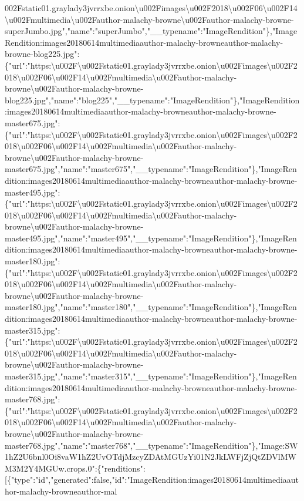 002Fstatic01.graylady3jvrrxbe.onion\textbackslash{}u002Fimages\textbackslash{}u002F2018\textbackslash{}u002F06\textbackslash{}u002F14\textbackslash{}u002Fmultimedia\textbackslash{}u002Fauthor-malachy-browne\textbackslash{}u002Fauthor-malachy-browne-superJumbo.jpg","name":"superJumbo","\_\_typename":"ImageRendition"\},"ImageRendition:images20180614multimediaauthor-malachy-browneauthor-malachy-browne-blog225.jpg":\{"url":"https:\textbackslash{}u002F\textbackslash{}u002Fstatic01.graylady3jvrrxbe.onion\textbackslash{}u002Fimages\textbackslash{}u002F2018\textbackslash{}u002F06\textbackslash{}u002F14\textbackslash{}u002Fmultimedia\textbackslash{}u002Fauthor-malachy-browne\textbackslash{}u002Fauthor-malachy-browne-blog225.jpg","name":"blog225","\_\_typename":"ImageRendition"\},"ImageRendition:images20180614multimediaauthor-malachy-browneauthor-malachy-browne-master675.jpg":\{"url":"https:\textbackslash{}u002F\textbackslash{}u002Fstatic01.graylady3jvrrxbe.onion\textbackslash{}u002Fimages\textbackslash{}u002F2018\textbackslash{}u002F06\textbackslash{}u002F14\textbackslash{}u002Fmultimedia\textbackslash{}u002Fauthor-malachy-browne\textbackslash{}u002Fauthor-malachy-browne-master675.jpg","name":"master675","\_\_typename":"ImageRendition"\},"ImageRendition:images20180614multimediaauthor-malachy-browneauthor-malachy-browne-master495.jpg":\{"url":"https:\textbackslash{}u002F\textbackslash{}u002Fstatic01.graylady3jvrrxbe.onion\textbackslash{}u002Fimages\textbackslash{}u002F2018\textbackslash{}u002F06\textbackslash{}u002F14\textbackslash{}u002Fmultimedia\textbackslash{}u002Fauthor-malachy-browne\textbackslash{}u002Fauthor-malachy-browne-master495.jpg","name":"master495","\_\_typename":"ImageRendition"\},"ImageRendition:images20180614multimediaauthor-malachy-browneauthor-malachy-browne-master180.jpg":\{"url":"https:\textbackslash{}u002F\textbackslash{}u002Fstatic01.graylady3jvrrxbe.onion\textbackslash{}u002Fimages\textbackslash{}u002F2018\textbackslash{}u002F06\textbackslash{}u002F14\textbackslash{}u002Fmultimedia\textbackslash{}u002Fauthor-malachy-browne\textbackslash{}u002Fauthor-malachy-browne-master180.jpg","name":"master180","\_\_typename":"ImageRendition"\},"ImageRendition:images20180614multimediaauthor-malachy-browneauthor-malachy-browne-master315.jpg":\{"url":"https:\textbackslash{}u002F\textbackslash{}u002Fstatic01.graylady3jvrrxbe.onion\textbackslash{}u002Fimages\textbackslash{}u002F2018\textbackslash{}u002F06\textbackslash{}u002F14\textbackslash{}u002Fmultimedia\textbackslash{}u002Fauthor-malachy-browne\textbackslash{}u002Fauthor-malachy-browne-master315.jpg","name":"master315","\_\_typename":"ImageRendition"\},"ImageRendition:images20180614multimediaauthor-malachy-browneauthor-malachy-browne-master768.jpg":\{"url":"https:\textbackslash{}u002F\textbackslash{}u002Fstatic01.graylady3jvrrxbe.onion\textbackslash{}u002Fimages\textbackslash{}u002F2018\textbackslash{}u002F06\textbackslash{}u002F14\textbackslash{}u002Fmultimedia\textbackslash{}u002Fauthor-malachy-browne\textbackslash{}u002Fauthor-malachy-browne-master768.jpg","name":"master768","\_\_typename":"ImageRendition"\},"Image:SW1hZ2U6bnl0Oi8vaW1hZ2UvOTdjMzcyZDAtMGUzYi01N2JkLWFjZjQtZDVlMWM3M2Y4MGUw.crops.0":\{"renditions":{[}\{"type":"id","generated":false,"id":"ImageRendition:images20180614multimediaauthor-malachy-browneauthor-mal